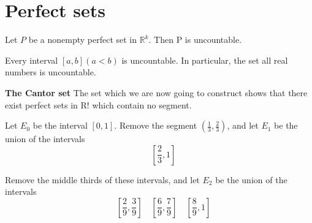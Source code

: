\section{Perfect sets}


\begin{thm}\label{thm:2.43 uncountable}
    Let $P$ be a nonempty perfect set in $\mathbb{R}^k$. Then P is uncountable.    
\end{thm}





\begin{myCorollary}
	Every interval $[a, b] (a <b)$ is uncountable. In particular, the set
	all real numbers is uncountable.
\end{myCorollary}


\begin{myDefinition}
	\textbf{The Cantor set} The set which we are now going to construct shows
	that there exist perfect sets in R! which contain no segment.
\end{myDefinition}

Let $E_0$ be the interval $[0, 1]$. Remove the segment $(\frac{1}{3}, \frac{2}{3})$, and let $E_1$ be the union of the intervals
\begin{equation*}
    [0, \frac{1}{3}] \quad 
    [\frac{2}{3}, 1]
\end{equation*}

Remove the middle thirds of these intervals, and let $E_2$ be the union of the intervals
\begin{equation*}
    [0, \frac{1}{9}] \quad 
    [\frac{2}{9}, \frac{3}{9}] \quad 
    [\frac{6}{9}, \frac{7}{9}] \quad 
    [\frac{8}{9}, 1]
\end{equation*}

